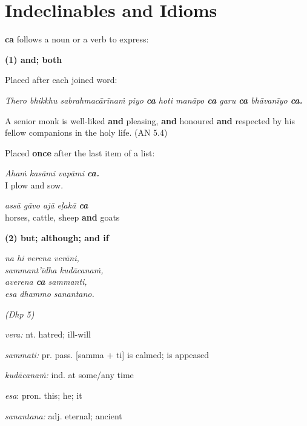 \documentclass[11pt,oneside]{memoir}
\begin{document}
\section{Indeclinables and Idioms}
\label{sec:org849fd65}

\textbf{ca} follows a noun or a verb to express:

\begin{multicols}{2}

\textbf{(1) and; both}

Placed after each joined word:

\emph{Thero bhikkhu sabrahmacārīnaṁ piyo \textbf{ca} hoti manāpo \textbf{ca} garu \textbf{ca} bhāvanīyo \textbf{ca.}}

A senior monk is well-liked \textbf{and} pleasing, \textbf{and} honoured \textbf{and} respected by his fellow companions in the holy life. (AN 5.4)

Placed \textbf{once} after the last item of a list:

\emph{Ahaṁ kasāmi vapāmi \textbf{ca.}} \\[0pt]
I plow and sow.

\emph{assā gāvo ajā eḷakā \textbf{ca}} \\[0pt]
horses, cattle, sheep \textbf{and} goats

\columnbreak

\textbf{(2) but; although; and if}

\emph{na hi verena verāni,} \\[0pt]
\emph{sammant'īdha kudācanaṁ,} \\[0pt]
\emph{averena \textbf{ca} sammanti,} \\[0pt]
\emph{esa dhammo sanantano.}

\emph{(Dhp 5)}

\emph{vera:} nt. hatred; ill-will

\emph{sammati:} pr. pass. [samma + ti] is calmed; is appeased

\emph{kudācanaṁ:} ind. at some/any time

\emph{esa}: pron. this; he; it

\emph{sanantana:} adj. eternal; ancient

\end{multicols}

\clearpage
\end{document}
